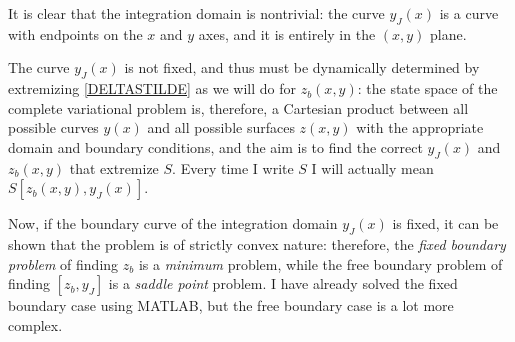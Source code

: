 \documentclass[binding=0.6cm, a4paper]{unifith}
\theoremstyle{plain}
\theoremstyle{definition}
\begin{document}
It is clear that the integration domain is nontrivial: the curve $y_J(x)$ is a curve with endpoints on the $x$ and $y$ axes, and it is entirely in the $(x,y)$ plane.

The curve $y_J(x)$ is not fixed, and thus must be dynamically determined by extremizing \eqref{DELTASTILDE} as we will do for $z_b(x,y)$: the state space of the complete variational problem is, therefore, a Cartesian product between all possible curves $y(x)$ and all possible surfaces $z(x,y)$ with the appropriate domain and boundary conditions, and the aim is to find the correct $y_J(x)$ and $z_b(x,y)$ that extremize $S$. Every time I write $S$ I will actually mean $S[z_b(x,y),y_J(x)]$. 

Now, if the boundary curve of the integration domain $y_J(x)$ is fixed, it can be shown that the problem is of strictly convex nature: therefore, the \textit{fixed boundary problem} of finding $z_b$ is a \textit{minimum} problem, while the free boundary problem of finding $[z_b,y_J]$ is a \textit{saddle point} problem. I have already solved the fixed boundary case using MATLAB, but the free boundary case is a lot more complex.
\end{document}

